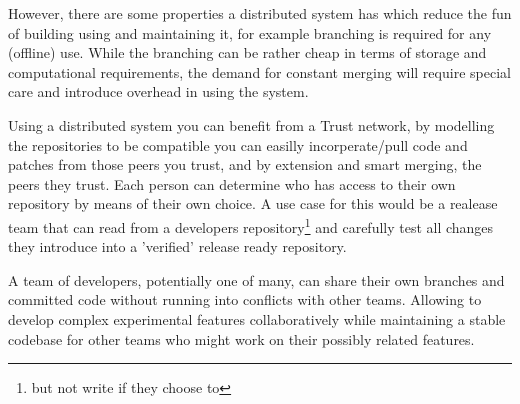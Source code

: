However, there are some properties a distributed system has which reduce the fun of building using and maintaining it,
for example branching is required for any (offline) use. While the branching can
be rather cheap in terms of storage and computational requirements, the demand
for constant merging will require special care and introduce overhead in using
the system.


Using a distributed system you can benefit from a Trust network, by modelling
the repositories to be compatible you can easilly incorperate/pull code and patches
from those peers you trust, and by extension and smart merging, the peers they
trust. Each person can determine who has access to their own repository by means
of their own choice. A use case for this would be a realease team that can read
from a developers repository\footnote{but not write if they choose to} and
carefully test all changes they introduce into a 'verified' release ready
repository.

A team of developers, potentially one of many, can share their own branches and
committed code without running into conflicts with other teams. Allowing to
develop complex experimental features collaboratively while maintaining a stable codebase for
other teams who might work on their possibly related features.

